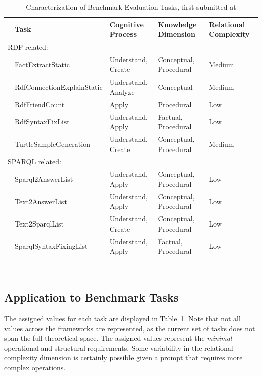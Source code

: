 \documentclass[
]{ceurart}
\begin{document}
\begin{table}
    \centering
        \caption{Characterization of Benchmark Evaluation Tasks, first submitted at \cite{Meyer2025EvaluatingLLMsForRdf}}
    \label{tab:taskCharacterizationApplied}
    \begin{tabular}{ll lll}
    	\toprule
    	& Task & Cognitive Process & Knowledge Dimension & Relational Complexity \\
    	\midrule
    	\multicolumn{2}{l}{RDF related:} & & & \\
    	& FactExtractStatic & Understand, Create & Conceptual, Procedural & Medium \\
    	& RdfConnectionExplainStatic & Understand, Analyze & Conceptual & Medium \\	
    	& RdfFriendCount & Apply & Procedural & Low \\	
    	& RdfSyntaxFixList & Understand, Apply & Factual, Procedural & Low \\	
    	& TurtleSampleGeneration & Understand, Create & Conceptual, Procedural & Medium \\	
        \midrule
        \multicolumn{2}{l}{SPARQL related:} & & & \\
    	& Sparql2AnswerList & Understand, Apply & Conceptual, Procedural & Low \\	
    	& Text2AnswerList & Understand, Apply & Conceptual, Procedural & Low \\	
    	& Text2SparqlList & Understand, Create & Conceptual, Procedural & Low \\	
    	& SparqlSyntaxFixingList & Understand, Apply & Factual, Procedural & Low \\	
    	\bottomrule
    \end{tabular}\\
\end{table}


\subsection{Application to Benchmark Tasks}
The assigned values for each task are displayed in Table~\ref{tab:taskCharacterizationApplied}. Note that not all values across the frameworks are represented, as the current set of tasks does not span the full theoretical space. The assigned values represent the \emph{minimal} operational and structural requirements. Some variability in the relational complexity dimension is certainly possible given a prompt that requires more complex operations. 
\end{document}
